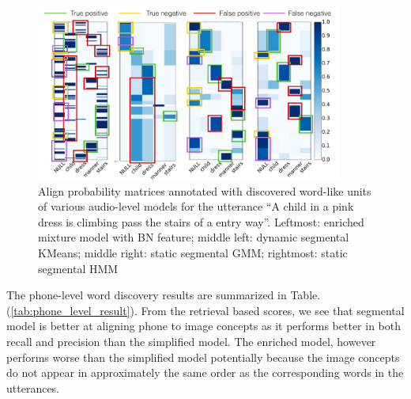 \documentclass[journal]{IEEEtran}
\begin{document}
\begin{figure}[t]
    \centering
    \includegraphics[width=0.9\textwidth]{fig_9.png}
    \caption{Align probability matrices annotated with discovered word-like units of various audio-level models for the utterance ``A child in a pink dress is climbing pass the stairs of a entry way''. Leftmost: enriched mixture model with BN feature; middle left: dynamic segmental KMeans; middle right: static segmental GMM; rightmost: static segmental HMM}
    \label{fig:audio_alignprob_plots}
\end{figure}

The phone-level word discovery results are summarized in Table. (\ref{tab:phone_level_result}).
From the retrieval based scores, we see that segmental model is better at aligning phone to image concepts as it performs better in both recall and precision than the simplified model. The enriched model, however performs worse than the simplified model potentially because the image concepts do not appear in approximately the same order as the corresponding words in the utterances. 
\end{document}
